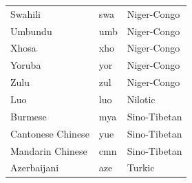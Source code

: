 \begin{longtable}{lll}
Swahili & swa & Niger-Congo\\
Umbundu & umb & Niger-Congo\\
Xhosa & xho & Niger-Congo\\
Yoruba & yor & Niger-Congo\\
Zulu & zul & Niger-Congo\\
Luo & luo & Nilotic\\
Burmese & mya & Sino-Tibetan\\
Cantonese Chinese & yue & Sino-Tibetan\\
Mandarin Chinese & cmn & Sino-Tibetan\\
Azerbaijani & aze & Turkic\\
\bottomrule\end{longtable}
